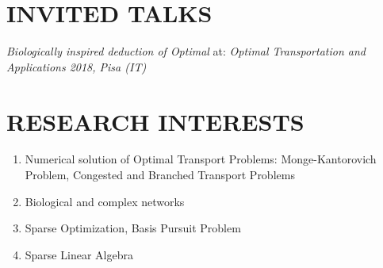 \documentclass[12pt]{article}
\begin{document}
\begin{refsection}
\nocite{*}
\printbibliography[heading=none, type=article, resetnumbers=true]
\end{refsection}

\section{\uppercase{Invited Talks}} 
\emph{Biologically inspired deduction of Optimal} at: \emph{Optimal Transportation and Applications 2018, Pisa (IT)}

\section{\uppercase{Research interests}}
\begin{enumerate}
\item Numerical solution of Optimal Transport Problems:
  Monge-Kantorovich Problem, Congested and Branched Transport Problems
\item Biological and complex networks
\item Sparse Optimization, Basis Pursuit Problem
\item Sparse Linear Algebra
\end{enumerate}
\end{document}

